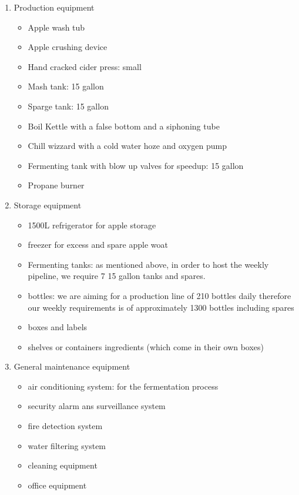 \documentclass[11pt]{article}
\begin{document}
    \begin{enumerate}
    \item Production equipment
      \begin{itemize}
      \item Apple wash tub
      \item Apple crushing device
      \item Hand cracked cider press: small
      \item Mash tank: 15 gallon
      \item Sparge tank: 15 gallon
      \item Boil Kettle with a false bottom and a siphoning tube
      \item Chill wizzard with a cold water hoze and oxygen pump
      \item Fermenting tank with blow up valves for speedup: 15 gallon
      \item Propane burner
      \end{itemize}

    \item Storage equipment
      \begin{itemize}
      \item 1500L refrigerator for apple storage
      \item freezer for excess and spare apple woat
      \item Fermenting tanks: as mentioned above, in order to host the weekly 
pipeline, we require 7 15 gallon tanks and spares.
      \item bottles: we are aiming for a production line of 210 bottles daily 
therefore our weekly requirements is of approximately 1300 bottles including 
spares
      \item boxes and labels
      \item shelves or containers ingredients (which come in their own boxes)
      \end{itemize}

    \item General maintenance equipment
      \begin{itemize}
      \item air conditioning system: for the fermentation process
      \item security alarm ans surveillance system
      \item fire detection system
      \item water filtering system
      \item cleaning equipment
      \item office equipment
      \end{itemize}
    \end{enumerate}
\end{document}
